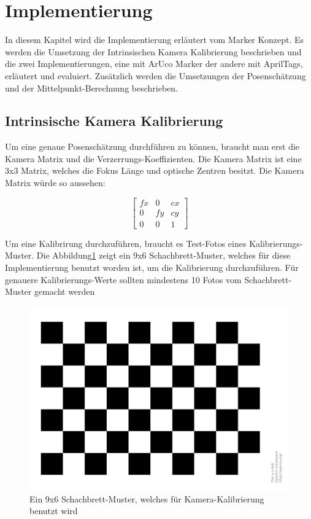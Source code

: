 \section{Implementierung}

In diesem Kapitel wird die Implementierung erläutert vom Marker Konzept. 
Es werden die Umsetzung der Intrinsischen Kamera Kalibrierung beschrieben und die zwei Implementierungen, eine mit ArUco Marker der andere mit AprilTags, erläutert und evaluiert.
Zusätzlich werden die Umsetzungen der Posenschätzung und der Mittelpunkt-Berechnung beschrieben.

\subsection{Intrinsische Kamera Kalibrierung}

Um eine genaue Posenschätzung durchführen zu können, braucht man erst die Kamera Matrix und die Verzerrungs-Koeffizienten. 
Die Kamera Matrix ist eine 3x3 Matrix, welches die Fokus Länge und optische Zentren besitzt. 
Die Kamera Matrix würde so aussehen:

\[
\begin{bmatrix}
fx & 0 & cx \\ 
0 & fy & cy \\ 
0 & 0  & 1 
\end{bmatrix}
\]

Um eine Kalibrirung durchzuführen, braucht es Test-Fotos eines Kalibrierungs-Muster. 
Die Abbildung\ref{fig:pattern} zeigt ein 9x6 Schachbrett-Muster, welches für diese Implementierung benutzt worden ist, um die Kalibrierung durchzuführen.
Für genauere Kalibrierungs-Werte sollten mindestens 10 Fotos vom Schachbrett-Muster gemacht werden \cite{noauthor_opencv_nodate-2}


\begin{figure}[H]
    \centering
    \includegraphics[width=0.5\linewidth]{graphics/pattern.png}
    \caption{Ein 9x6 Schachbrett-Muster, welches für Kamera-Kalibrierung benutzt wird}
    \label{fig:pattern}
\end{figure}

